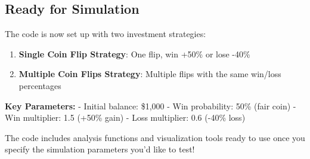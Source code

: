 \documentclass[
  letterpaper,
  DIV=11,
  numbers=noendperiod]{scrartcl}
\providecommand{\tightlist}{%
  \setlength{\itemsep}{0pt}\setlength{\parskip}{0pt}}
\begin{document}
\subsection{Ready for Simulation}\label{ready-for-simulation}

The code is now set up with two investment strategies:

\begin{enumerate}
\def\labelenumi{\arabic{enumi}.}
\tightlist
\item
  \textbf{Single Coin Flip Strategy}: One flip, win +50\% or lose -40\%
\item
  \textbf{Multiple Coin Flips Strategy}: Multiple flips with the same
  win/loss percentages
\end{enumerate}

\textbf{Key Parameters:} - Initial balance: \$1,000 - Win probability:
50\% (fair coin) - Win multiplier: 1.5 (+50\% gain) - Loss multiplier:
0.6 (-40\% loss)

The code includes analysis functions and visualization tools ready to
use once you specify the simulation parameters you'd like to test!
\end{document}
